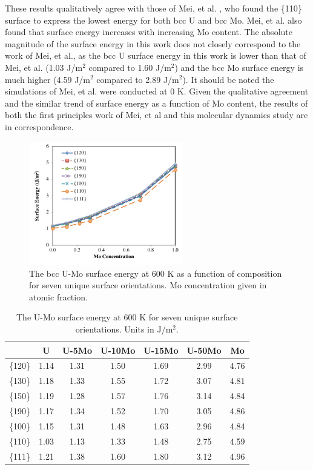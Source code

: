 \documentclass[review]{elsarticle}
\begin{document}
These results qualitatively agree with those of Mei, et al. \cite{zhigang2018}, who found the \{110\} surface to express the lowest energy for both bcc U and bcc Mo. Mei, et al. also found that surface energy increases with increasing Mo content. The absolute magnitude of the surface energy in this work does not closely correspond to the work of Mei, et al., as the bcc U surface energy in this work is lower than that of Mei, et al. (1.03 J/m$^{2}$ compared to 1.60 J/m$^{2}$) and the bcc Mo surface energy is much higher (4.59 J/m$^{2}$ compared to 2.89 J/m$^{2}$). It should be noted the simulations of Mei, et al. were conducted at 0 K. Given the qualitative agreement and the similar trend of surface energy as a function of Mo content, the results of both the first principles work of Mei, et al \cite{zhigang2018} and this molecular dynamics study are in correspondence.

\begin{figure}[h]
 \centering
 \includegraphics[width=0.6\textwidth]{umosurf600A.png} 
 \caption{The bcc U-Mo surface energy at 600 K as a function of composition for seven unique surface orientations. Mo concentration given in atomic fraction.}
 \label{fig:umosurf600}
\end{figure}

\begin{table}[h]
\caption{The U-Mo surface energy at 600 K for seven unique surface orientations. Units in J/m$^{2}$. } \label{tab:umosurf600}
\begin{center}
\begin{tabular}{|c|c|c|c|c|c|c|}
	\hline
 & U & U-5Mo & U-10Mo & U-15Mo & U-50Mo & Mo \\
\hline
\{120\} & 1.14 & 1.31 & 1.50 & 1.69 & 2.99 & 4.76 \\
\{130\}	 & 1.18 & 1.33 & 1.55 & 1.72 & 3.07 & 4.81 \\ 
\{150\}	 & 1.19 & 1.28 & 1.57 & 1.76 & 3.14 & 4.84 \\
\{190\}	 & 1.17 & 1.34 & 1.52 & 1.70 & 3.05 & 4.86 \\
\{100\}	 & 1.15 & 1.31 & 1.48 & 1.63 & 2.96 & 4.84 \\
\{110\}	 & 1.03 & 1.13 & 1.33 & 1.48 & 2.75 & 4.59 \\
\{111\}	 & 1.21 & 1.38 & 1.60 & 1.80 & 3.12 & 4.96 \\
 	 \hline
\end{tabular}
\end{center}
\label{default}
\end{table}
\end{document}
